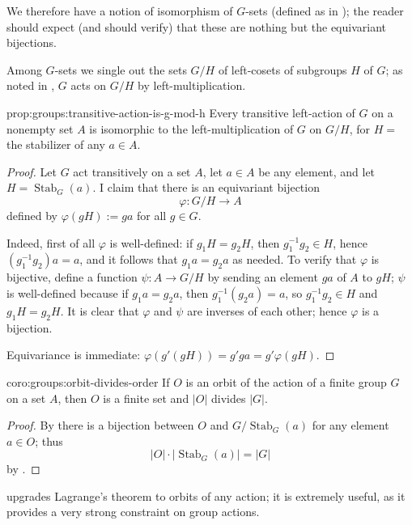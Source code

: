 We therefore have a notion of isomorphism of $G$-sets (defined as in
); the reader should expect (and
should verify) that these are nothing but the equivariant bijections.

Among $G$-sets we single out the sets $G/H$ of left-cosets of
subgroups $H$ of $G$; as noted in
, $G$ acts on $G/H$ by
left-multiplication.

\begin{prop}{}{prop:groups:transitive-action-is-g-mod-h}
  Every transitive left-action of $G$ on a nonempty set $A$
    is isomorphic to the left-multiplication of $G$ on $G/H$, for
    $H =$ the stabilizer of any
    $a \in A$.
\end{prop}
\begin{proof}
  Let $G$ act transitively on a set $A$, let $a \in A$ be any element,
  and let $H = \operatorname{Stab}_G(a)$. I claim that there is an
  equivariant bijection
  \[
    \varphi : G/H \to A
  \]
  defined by $\varphi(gH) := ga$ for all $g \in G$.

  Indeed, first of all $\varphi$ is well-defined: if $g_1H = g_2H$,
  then $g_1^{-1}g_2 \in H$, hence $(g_1^{-1}g_2)a = a$, and it follows
  that $g_1a = g_2a$ as needed. To verify that $\varphi$ is bijective,
  define a function $\psi : A \to G/H$ by sending an element $ga$ of
  $A$ to $gH$; $\psi$ is well-defined because if $g_1a = g_2a$, then
  $g_1^{-1}(g_2a) = a$, so $g_1^{-1}g_2 \in H$ and $g_1H = g_2H$. It
  is clear that $\varphi$ and $\psi$ are inverses of each other; hence
  $\varphi$ is a bijection.

  Equivariance is immediate: $\varphi(g'(gH)) = g'ga = g'\varphi(gH)$.
\end{proof}

\begin{coro}{}{coro:groups:orbit-divides-order}
  If $O$ is an orbit of the action of a finite group $G$ on
    a set $A$, then $O$ is a finite set and $|O|$ divides
    $|G|$.
\end{coro}
\begin{proof}
  By  there
  is a bijection between $O$ and $G/\operatorname{Stab}_G(a)$ for any
  element $a \in O$; thus
  \[
    |O| \cdot |\operatorname{Stab}_G(a)| = |G|
  \]
  by .
\end{proof}

 upgrades Lagrange's
theorem to orbits of any action; it is extremely useful, as it
provides a very strong constraint on group actions.


